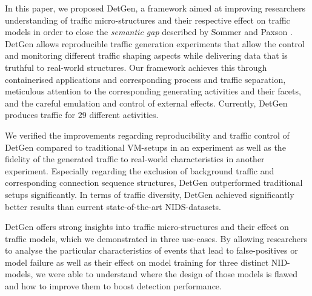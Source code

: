 \documentclass[sigconf]{acmart}
\begin{document}
In this paper, we proposed DetGen, a framework aimed at improving researchers understanding of traffic micro-structures and their respective effect on traffic models in order to close the \emph{semantic gap} described by Sommer and Paxson \cite{sommer2010outside}. DetGen allows reproducible traffic generation experiments that allow the control and monitoring different traffic shaping aspects while delivering data that is truthful to real-world structures. Our framework achieves this through containerised applications and corresponding process and traffic separation, meticulous attention to the corresponding generating activities and their facets, and the careful emulation and control of external effects. Currently, DetGen produces traffic for 29 different activities.

We verified the improvements regarding reproducibility and traffic control of DetGen compared to traditional VM-setups in an experiment as well as the fidelity of the generated traffic to real-world characteristics in another experiment. Especially regarding the exclusion of background traffic and corresponding connection sequence structures, DetGen outperformed traditional setups significantly. In terms of traffic diversity, DetGen achieved significantly better results than current state-of-the-art NIDS-datasets.

DetGen offers strong insights into traffic micro-structures and their effect on traffic models, which we demonstrated in three use-cases. By allowing researchers to analyse the particular characteristics of events that lead to false-positives or model failure as well as their effect on model training for three distinct NID-models, we were able to understand where the design of those models is flawed and how to improve them to boost detection performance. 


\end{document}
